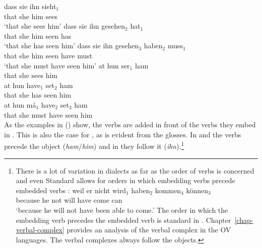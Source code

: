 \eal
\ex
\gll dass sie ihn sieht$_1$\\
     that she him sees\\
\glt `that she sees him'
\ex
\gll dass sie ihn gesehen$_2$ hat$_1$\\
     that she him seen        has\\
\glt `that she has seen him'
\ex
\gll dass sie ihn gesehen$_3$ haben$_2$ muss$_1$\\
     that she him seen        have     must\\
\glt `that she must have seen him'
\zl
\eal
\label{ex-Danish-embedding}
\ex
\gll at   hun ser$_1$ ham\\
     that she  sees    him\\
\ex
\gll at   hun have$_1$ set$_2$ ham\\
     that she  has      seen    him\\
\ex
\gll at   hun må$_1$ have$_2$ set$_3$ ham\\
     that she  must   have     seen   him\\
\zl
%
As the examples in () show, the verbs are added in front of the verbs they embed in
. This is also the case for , as is evident from the glosses. In  and  the
verbs precede the object (\emph{ham}/\emph{him}) and in  they follow it
(\emph{ihn}).\footnote{
There is a lot of variation in  dialects as far as the order of verbs is concerned and even
Standard  allows for orders in which embedding verbs precede embedded verbs \parencites[--64]{Bech55a}[]{dBE83a}:
\ea
\gll weil er nicht wird$_1$ haben$_2$ kommen$_4$ können$_3$\\
     because he not will have come   can\\\german
\glt `because he will not have been able to come.'
\z
The order in which the embedding verb precedes the embedded verb is standard in  \citep[]{dBE83a}. Chapter~\ref{chap-verbal-complex}
provides an analysis of the verbal complex in the  OV languages. The verbal complexes always follow the objects.  
} 

